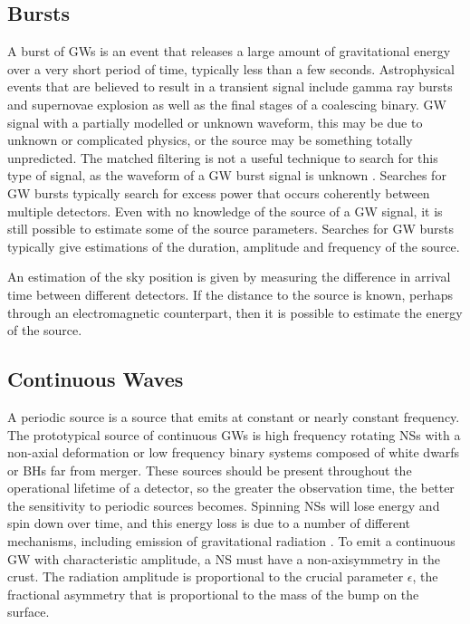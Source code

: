 \documentclass[binding=0.6cm, LaM]{sapthesis}
\begin{document}
\subsection{Bursts}
	A burst of GWs is an event that releases a large amount 
	of gravitational energy over a very short period of time, typically less than a few seconds.
	Astrophysical events that are believed to result in a transient signal 
	include gamma ray bursts and supernovae explosion as well as the final stages of a coalescing binary. 
	GW signal with a partially modelled or unknown waveform, 
	this may be due to unknown or complicated physics, or the source may be something totally unpredicted. 
	The matched filtering is not a useful technique to search for this type of signal, 
	as the waveform of a GW burst signal is unknown \cite{3}. 
	Searches for GW bursts typically search for excess power that occurs coherently between multiple detectors.
	Even with no knowledge of the source of a GW signal, 
	it is still possible to estimate some of the source parameters. 
	Searches for GW bursts typically give estimations of the duration, 
	amplitude and frequency of the source.

	An estimation of the sky position is given by measuring the difference 
	in arrival time between different detectors. 
	If the distance to the source is known, 
	perhaps through an electromagnetic counterpart, 
	then it is possible to estimate the energy of the source. 

\subsection{Continuous Waves}
	A periodic source is a source that emits at constant or nearly constant frequency.
	The prototypical source of continuous GWs is high frequency rotating NSs 
	with a non-axial deformation or low frequency binary systems 
	composed of white dwarfs or BHs far from merger. 
	These sources should be present throughout the operational lifetime of a detector, 
	so the greater the observation time, the better the sensitivity to periodic sources becomes. 
	Spinning NSs will lose energy and spin down over time, 
	and this energy loss is due to a number of different mechanisms, 
	including emission of gravitational radiation \cite{3}. 
	To emit a continuous GW with characteristic amplitude, 
	a NS must have a non-axisymmetry in the crust. 
	The radiation amplitude is proportional to the crucial parameter $\epsilon$, 
	the fractional asymmetry that is proportional to the mass of the bump on the surface.
\end{document}
